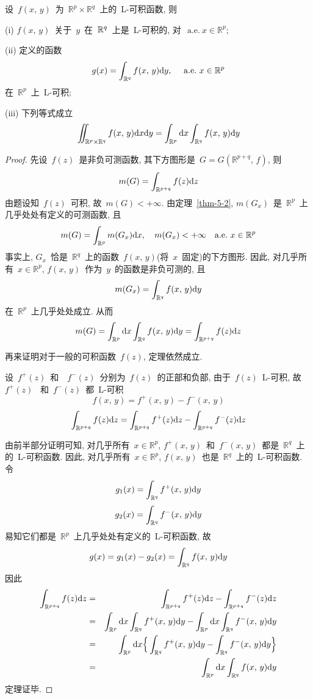 \begin{theorem} \label{thm-5-3}
设~$f(x,\, y)$~为~$\mathbb{R}^{p}\times \mathbb{R}^{q}$~上的~L-可积函数, 则

(i) $f(x,\, y)$~关于~$y$~在~$\mathbb{R}^q$~上是~L-可积的, 对~$\mathrm{~a.e.~} x \in \mathbb{R}^{p}$;

(ii) 定义的函数
 \[
 g(x)=\int_{\mathbb{R}^{q}}f(x,\, y)\mathrm{d} y, \quad \mathrm{~a.e.~} x \in \mathbb{R}^{p}
 \]
 在~$\mathbb{R}^{p}$~上~L-可积;

(iii) 下列等式成立
 \[
 \iint_{\mathbb{R}^p \times \mathbb{R}^q}f(x,\,y) \mathrm{d} x \mathrm{d} y=\int_{\mathbb{R}^{p}}\mathrm{d} x\int_{\mathbb{R}^{q}}f(x,\, y)\mathrm{d} y
 \]
\end{theorem}

\begin{proof}
先设~$f(z)$~是非负可测函数, 其下方图形是~$G=G(\mathbb{R}^{p+q},\, f)$, 则
\[
m(G)=\int_{\mathbb{R}^{p+q}}f(z)\mathrm{d} z
\]
由题设知~$f(z)$~可积, 故~$m(G) < +\infty$. 由定理~\ref{thm-5-2},  $m(G_{x})$~是~$\mathbb{R}^{p}$~上几乎处处有定义的可测函数, 且
\[
m(G)=\int_{\mathbb{R}^{p}}m(G_{x}) \mathrm{d} x, \quad m(G_{x}) < +\infty \quad \mathrm{a.e.~} x \in \mathbb{R}^{p}
\]
事实上, $G_{x}$~恰是~$\mathbb{R}^{q}$~上的函数~$f(x,\, y)$(将~$x$~固定)的下方图形. 因此, 对几乎所有~$x \in \mathbb{R}^{p}$, $f(x,\, y)$~作为~$y$~的函数是非负可测的, 且
\[
m(G_{x})=\int_{\mathbb{R}^{q}}f(x,\, y)\mathrm{d} y
\]
在~$\mathbb{R}^{p}$~上几乎处处成立. 从而
\[
m(G)=\int_{\mathbb{R}^{p}} \mathrm{d} x \int_{\mathbb{R}^{q}}f(x,\, y)\mathrm{d} y=\int_{\mathbb{R}^{p+q}}f(z) \mathrm{d} z
\]

再来证明对于一般的可积函数~$f(z)$, 定理依然成立.

设~$f^{+}(z)$~和~~$f^{-}(z)$~分别为~$f(z)$~的正部和负部, 由于~$f(z)$~L-可积, 故~$f^{+}(z)$~
和~$f^{-}(z)$~都~L-可积
\[
f(x,\, y)=f^{+}(x,\, y)-f^{-}(x,\, y)
\]
\[
\int_{\mathbb{R}^{p+q}}f(z)\mathrm{d} z=\int_{\mathbb{R}^{p+q}}f^{+}(z)\mathrm{d} z -\int_{\mathbb{R}^{p+q}}f^{-}(z)\mathrm{d} z
\]

由前半部分证明可知, 对几乎所有~$x\in \mathbb{R}^{p}$, $f^{+}(x,\, y)$~和~$f^{-}(x,\, y)$~都是~$\mathbb{R}^{q}$~上的~L-可积函数. 因此, 对几乎所有~$x\in \mathbb{R}^{p}$, $f(x,\, y)$~也是~$\mathbb{R}^{q}$~上的~L-可积函数. 令
\[
g_1(x) = \int_{\mathbb{R}^{q}}f^{+}(x,\, y)\mathrm{d} y
\]
\[
g_2(x) = \int_{\mathbb{R}^{q}}f^{-}(x,\, y)\mathrm{d} y
\]
易知它们都是~$\mathbb{R}^{p}$~上几乎处处有定义的~L-可积函数, 故
\[
g(x)=g_1(x)-g_2(x)=\int_{\mathbb{R}^{q}}f(x,\, y)\mathrm{d} y
\]
因此
\begin{eqnarray*}
\int_{\mathbb{R}^{p+q}}f(z)\mathrm{d} z&=&\int_{\mathbb{R}^{p+q}}f^{+}(z)\mathrm{d} z-\int_{\mathbb{R}^{p+q}}f^{-}(z)\mathrm{d} z\\
&=&\int_{\mathbb{R}^{p}}\mathrm{d} x\int_{\mathbb{R}^{q}}f^{+}(x,\, y)\mathrm{d} y -\int_{\mathbb{R}^{p}}\mathrm{d} x \int_{\mathbb{R}^{q}}f^{-}(x,\, y)\mathrm{d} y\\
&=&\int_{\mathbb{R}^{p}}\mathrm{d} x \Big\{\int_{\mathbb{R}^{q}}f^{+}(x,\, y)\mathrm{d} y-\int_{\mathbb{R}^{q}}f^{-}(x,\, y)\mathrm{d} y \Big\}\\
&=&\int_{\mathbb{R}^{p}}\mathrm{d} x\int_{\mathbb{R}^{q}}f(x,\, y)\mathrm{d} y
\end{eqnarray*}
定理证毕.
\end{proof}

